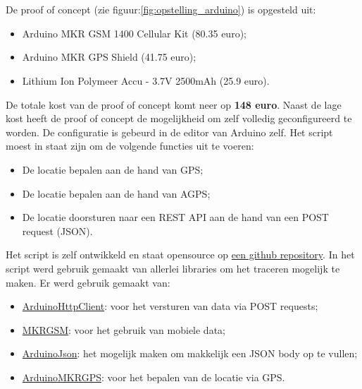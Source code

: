 \chapter{}
\label{ch:corpus}

\section{}
\label{ch:proof-of-concept}

\subsection{}
De proof of concept (zie figuur:\ref{fig:opstelling_arduino}) is opgesteld uit:
\begin{itemize}
	\item Arduino MKR GSM 1400 Cellular Kit (80.35 euro);
	\item Arduino MKR GPS Shield (41.75 euro);
	\item Lithium Ion Polymeer Accu - 3.7V 2500mAh (25.9 euro).
\end{itemize}
De totale kost van de proof of concept komt neer op \textbf{148 euro}. Naast de lage kost heeft de proof of concept de mogelijkheid om zelf volledig geconfigureerd te worden. De configuratie is gebeurd in de editor van Arduino zelf. Het script moest in staat zijn om de volgende functies uit te voeren:
\begin{itemize}
	\item De locatie bepalen aan de hand van GPS;
	\item De locatie bepalen aan de hand van AGPS;
	\item De locatie doorsturen naar een REST API aan de hand van een POST request (JSON).
\end{itemize}
Het script is zelf ontwikkeld en staat opensource op \href{https://github.com/IndyVC/bap-arduino}{een github repository}. In het script werd gebruik gemaakt van allerlei libraries om het traceren mogelijk te maken.
Er werd gebruik gemaakt van:
\begin{itemize}
	\item \href{https://github.com/arduino-libraries/ArduinoHttpClient}{ArduinoHttpClient}: voor het versturen van data via POST requests;
	\item \href{https://github.com/arduino-libraries/MKRGSM}{MKRGSM}: voor het gebruik van mobiele data;
	\item \href{https://github.com/bblanchon/ArduinoJson}{ArduinoJson}: het mogelijk maken om makkelijk een JSON body op te vullen;
	\item \href{https://github.com/arduino-libraries/Arduino_MKRGPS}{ArduinoMKRGPS}: voor het bepalen van de locatie via GPS.
\end{itemize}
